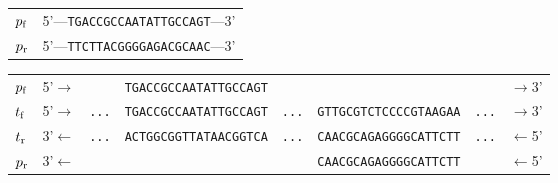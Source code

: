 \begin{center}
  \begin{tabular}{cc}
    $p_{\rm f}$ & 5'---\texttt{TGACCGCCAATATTGCCAGT}---3'\\
    $p_{\rm r}$ & 5'---\texttt{TTCTTACGGGGAGACGCAAC}---3'\\
  \end{tabular}
\end{center}
\begin{center}
  \begin{tabular}{lccccccc}
    $p_{\rm f}$ & 
    5'$\rightarrow$ & &
    \texttt{TGACCGCCAATATTGCCAGT} &&&&
    $\rightarrow$3'
    \\
    $t_{\rm f}$ &
    5'$\rightarrow$ &
    \texttt{...} &
    \texttt{TGACCGCCAATATTGCCAGT} &
    \texttt{...} &
    \texttt{GTTGCGTCTCCCCGTAAGAA} &
    \texttt{...} &
    $\rightarrow$3'
    \\
    $t_{\rm r}$ &
    3'$\leftarrow$ &
    \texttt{...} &
    \texttt{ACTGGCGGTTATAACGGTCA} &
    \texttt{...} &
    \texttt{CAACGCAGAGGGGCATTCTT} &
    \texttt{...} &
    $\leftarrow$5'
    \\
    $p_{\rm r}$ &
    3'$\leftarrow$ & & & &
    \texttt{CAACGCAGAGGGGCATTCTT} &&
    $\leftarrow$5'
  \end{tabular}
\end{center}
